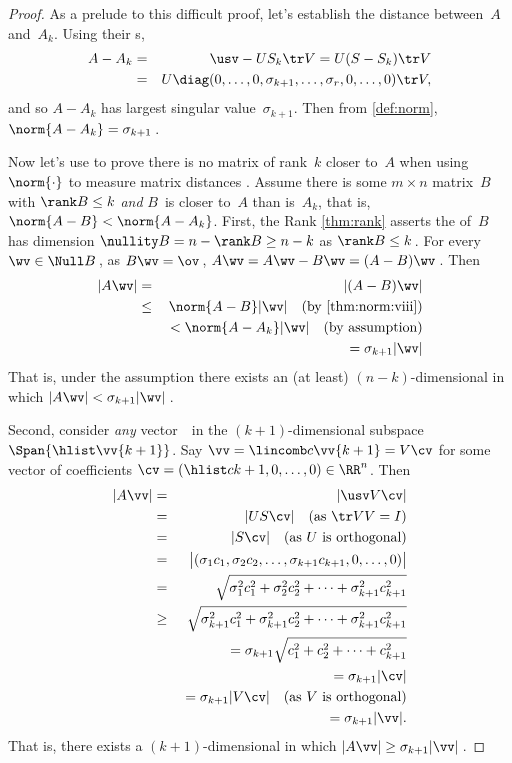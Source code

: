 \begin{proof} 
As a prelude to this difficult proof, let's establish the distance between~\(A\) and~\(A_k\). 
Using their \svd{}s,
\begin{eqnarray*}
A-A_k&=&\usv-US_k\tr V=U(S-S_k)\tr V
\\&=&U\diag(0,\ldots,0,\sigma_{k+1},\ldots,\sigma_r,0,\ldots,0)\tr V,
\end{eqnarray*}
and so \(A-A_k\) has largest singular value~\(\sigma_{k+1}\).
Then from \cref{def:norm}, \(\norm{A-A_k}=\sigma_{k+1}\)\,.

Now let's use  to prove there is no matrix of rank~\(k\) closer to~\(A\) when using \(\norm{\cdot}\) to measure matrix distances \cite[p.36]{Trefethen1997}.
Assume there is some \(m\times n\) matrix~\(B\) with \(\rank B\leq k\) \emph{and} \(B\)~is closer to~\(A\) than is~\(A_k\), that is, \(\norm{A-B}<\norm{A-A_k}\).
First, the Rank \cref{thm:rank} asserts the  of~\(B\) has dimension \(\nullity B =n-\rank B\geq n-k\) as  \(\rank B\leq k\)\,.
For every \(\wv\in\Null B\)\,,  as \(B\wv=\ov\)\,,  \(A\wv=A\wv-B\wv=(A-B)\wv\)\,. 
Then
\begin{eqnarray*}
|A\wv|&=&|(A-B)\wv|
\\&\leq&\norm{A-B}|\wv| 
\quad(\text{by \cref{thm:norm:viii}})
\\&&{}<\norm{A-A_k}|\wv|
\quad(\text{by assumption})
\\&&\phantom{{}<}{}=\sigma_{k+1}|\wv|
\end{eqnarray*}
That is, under the assumption there exists an (at least) \((n-k)\)-dimensional  in which \(|A\wv|<\sigma_{k+1}|\wv|\)\,.

Second, consider \emph{any} vector~\vv\ in the \((k+1)\)-dimensional subspace \(\Span\{\hlist\vv{k+1}\}\).
Say \(\vv=\lincomb c\vv{k+1}=V\cv\) for some vector of coefficients \(\cv=(\hlist c{k+1},0,\ldots,0)\in\RR^n\).
Then
\begin{eqnarray*}
|A\vv|&=&|\usv V\cv|
\\&=&|US\cv| \quad(\text{as }\tr VV=I)
\\&=&|S\cv| \quad(\text{as \(U\) is orthogonal})
\\&=&\big|(\sigma_1c_1,\sigma_2c_2,\ldots,\sigma_{k+1}c_{k+1},0,\ldots,0)\big|
\\&=&\sqrt{\sigma_1^2c_1^2+\sigma_2^2c_2^2+\cdots+\sigma_{k+1}^2c_{k+1}^2}
\\&\geq&\sqrt{\sigma_{k+1}^2c_1^2+\sigma_{k+1}^2c_2^2+\cdots+\sigma_{k+1}^2c_{k+1}^2}
\\&&{}=\sigma_{k+1}\sqrt{c_1^2+c_2^2+\cdots+c_{k+1}^2}
\\&&{}=\sigma_{k+1}|\cv|
\\&&{}=\sigma_{k+1}|V\cv|\quad(\text{as \(V\) is orthogonal})
\\&&{}=\sigma_{k+1}|\vv|.
\end{eqnarray*}
That is, there exists a \((k+1)\)-dimensional  in which \(|A\vv|\geq\sigma_{k+1}|\vv|\)\,.


\end{proof}
